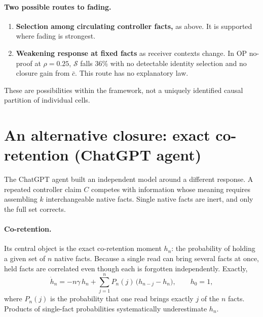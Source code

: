 \documentclass[10pt,a4paper]{article}
\theoremstyle{definition}
\newcommand{\Sus}{\mathcal S}
\begin{document}
\paragraph{Two possible routes to fading.}
\begin{enumerate}
\item \textbf{Selection among circulating controller facts,} as above. It is supported where fading is strongest.
\item \textbf{Weakening response at fixed facts} as receiver contexts change. In OP no-proof at $\rho=0.25$, $\Sus$
  falls 36\% with no detectable identity selection and no closure gain from $\bar c$. This route has no explanatory
  law.
\end{enumerate}
These are possibilities within the framework, not a uniquely identified causal partition of individual cells.

\section{An alternative closure: exact co-retention (ChatGPT agent)}
\label{sec:gpt}
The ChatGPT agent built an independent model around a different response. A repeated controller claim $C$ competes with
information whose meaning requires assembling $k$ interchangeable native facts. Single native facts are inert, and only
the full set corrects.

\paragraph{Co-retention.} Its central object is the exact co-retention moment $h_n$: the probability of holding a given
set of $n$ native facts. Because a single read can bring several facts at once, held facts are correlated even though
each is forgotten independently. Exactly,
\begin{equation}
\dot h_n=-n\gamma\,h_n+\sum_{j=1}^{n}P_n(j)\,\big(h_{n-j}-h_n\big),\qquad h_0=1,
\end{equation}
where $P_n(j)$ is the probability that one read brings exactly $j$ of the $n$ facts. Products of single-fact
probabilities systematically underestimate $h_n$.
\end{document}
